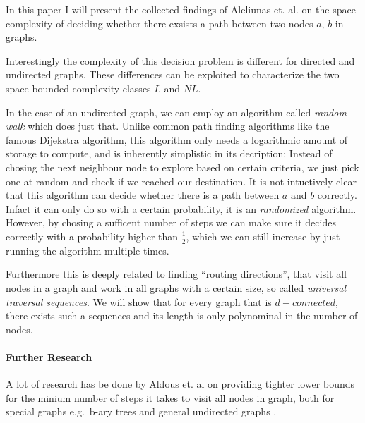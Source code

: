

\newtheorem{thm}{Theorem}

In this paper I will present the collected findings of Aleliunas et. al.
 on the space complexity of deciding
whether there exsists a path between two nodes $a$, $b$ in graphs.

Interestingly the complexity of this decision problem is different for
directed and undirected graphs. These differences can be exploited to
characterize the two space-bounded complexity classes $L$ and $NL$.

In the case of an undirected graph, we can employ an algorithm called
\emph{random walk} which does just that. Unlike common path finding
algorithms like the famous Dijekstra algorithm, this algorithm only
needs a logarithmic amount of storage to compute, and is inherently
simplistic in its decription: Instead of chosing the next neighbour node
to explore based on certain criteria, we just pick one at random and
check if we reached our destination. It is not intuetively clear that
this algorithm can decide whether there is a path between $a$ and $b$
correctly. Infact it can only do so with a certain probability, it is an
\emph{randomized} algorithm. However, by chosing a sufficent number of
steps we can make sure it decides correctly with a probability higher
than $\frac{1}{2}$, which we can still increase by just running the
algorithm multiple times.

Furthermore this is deeply related to finding ``routing directions'',
that visit all nodes in a graph and work in all graphs with a certain
size, so called \emph{universal traversal sequences}. We will show that
for every graph that is $d-connected$, there exists such a sequences and
its length is only polynominal in the number of nodes.

\paragraph{Further Research}\label{further-research}

A lot of research has be done by Aldous et. al on providing tighter
lower bounds for the minium number of steps it takes to visit all nodes
in graph, both for special graphs e.g.~b-ary trees
 and general undirected graphs
.

